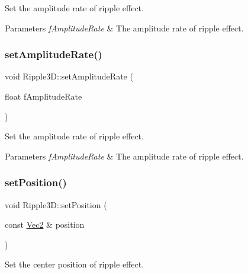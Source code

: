 Set the amplitude rate of ripple effect. 


\begin{DoxyParams}{Parameters}
{\em f\+Amplitude\+Rate} & The amplitude rate of ripple effect. \\
\hline
\end{DoxyParams}
\mbox{\label{classRipple3D_a328b21e3d9d03027cd9bcb7873b77b2d}} 
\subsubsection{\texorpdfstring{set\+Amplitude\+Rate()}{setAmplitudeRate()}\hspace{0.1cm}{\footnotesize\ttfamily [2/2]}}
{\footnotesize\ttfamily void Ripple3\+D\+::set\+Amplitude\+Rate (\begin{DoxyParamCaption}\item[{float}]{f\+Amplitude\+Rate }\end{DoxyParamCaption})\hspace{0.3cm}{\ttfamily [inline]}}



Set the amplitude rate of ripple effect. 


\begin{DoxyParams}{Parameters}
{\em f\+Amplitude\+Rate} & The amplitude rate of ripple effect. \\
\hline
\end{DoxyParams}
\mbox{\label{classRipple3D_af80c68000b6bb6f2e1d8f78cd8712ef7}} 
\subsubsection{\texorpdfstring{set\+Position()}{setPosition()}\hspace{0.1cm}{\footnotesize\ttfamily [1/2]}}
{\footnotesize\ttfamily void Ripple3\+D\+::set\+Position (\begin{DoxyParamCaption}\item[{const \hyperlink{classVec2}{Vec2} \&}]{position }\end{DoxyParamCaption})}



Set the center position of ripple effect. 


